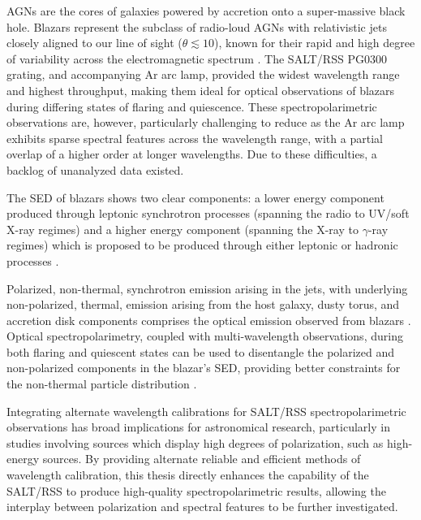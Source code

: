 \glspl{AGN} are the cores of galaxies powered by accretion onto a super-massive black hole.
Blazars represent the subclass of radio-loud \glspl{AGN} with relativistic jets closely aligned to our line of sight ($\theta \lesssim 10$\degree), known for their rapid and high degree of variability across the electromagnetic spectrum \citep{Urry_1995}.
The \gls{SALT}/\gls{RSS} PG$0300$ grating, and accompanying \gls{Ar} arc lamp, provided the widest wavelength range and highest throughput, making them ideal for optical observations of blazars during differing states of flaring and quiescence.
These spectro\-polarimetric observations are, however, particularly challenging to reduce as the \gls{Ar} arc lamp exhibits sparse spectral features across the wavelength range, with a partial overlap of a higher order at longer wavelengths.
Due to these difficulties, a backlog of unanalyzed data existed.

The \gls{SED} of blazars shows two clear components:
a lower energy component produced through leptonic synchrotron processes (spanning the radio to \gls{UV}/soft X-ray regimes)
and a higher energy component (spanning the X-ray to $\gamma$-ray regimes) which is proposed to be produced through either leptonic or hadronic processes \citep{Bottcher_2013}.

Polarized, non-thermal, synchrotron emission arising in the jets, with underlying non-polarized, thermal, emission arising from the host galaxy, dusty torus, and accretion disk components comprises the optical emission observed from blazars \citep{Ghisellini_2009}.
Optical spectropolarimetry, coupled with multi-wavelength observations, during both flaring and quiescent states can be used to disentangle the polarized and non-polarized components in the blazar's \gls{SED}, providing better constraints for the non-thermal particle distribution \citep{Schutte_COSPAR, Schutte4C0102}.

Integrating alternate wavelength calibrations for \gls{SALT}/\gls{RSS} spectro\-polarimetric observations has broad implications for astronomical research, particularly in studies involving sources which display high degrees of polarization, such as high-energy sources.
By providing alternate reliable and efficient methods of wavelength calibration, this thesis directly enhances the capability of the \gls{SALT}/\gls{RSS} to produce high-quality spectropolarimetric results, allowing the interplay between polarization and spectral features to be further investigated.

